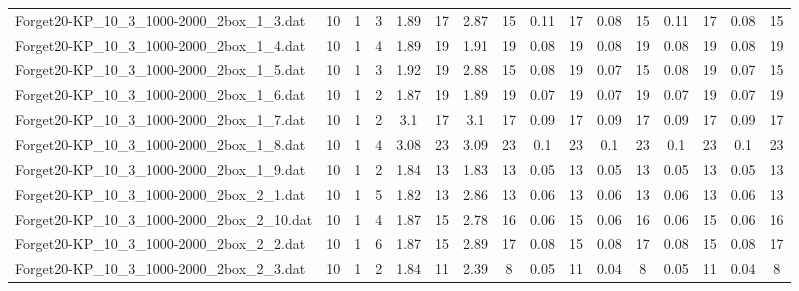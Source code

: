 \begin{sidewaystable}[!ht]
{\begin{tabular}{lccccccccccccccc}
Forget20-KP\_10\_3\_1000-2000\_2box\_1\_3.dat & 10 & 1 & 3 & 1.89 & 17 & 2.87 & 15 & 0.11 & 17 & 0.08 & 15 & 0.11 & 17 & 0.08 & 15 \\
Forget20-KP\_10\_3\_1000-2000\_2box\_1\_4.dat & 10 & 1 & 4 & 1.89 & 19 & 1.91 & 19 &  \textcolor{blue2}{0.08} & 19 &  \textcolor{blue2}{0.08} & 19 &  \textcolor{blue2}{0.08} & 19 &  \textcolor{blue2}{0.08} & 19 \\
Forget20-KP\_10\_3\_1000-2000\_2box\_1\_5.dat & 10 & 1 & 3 & 1.92 & 19 & 2.88 & 15 & 0.08 & 19 &  \textcolor{blue2}{0.07} & 15 & 0.08 & 19 &  \textcolor{blue2}{0.07} & 15 \\
Forget20-KP\_10\_3\_1000-2000\_2box\_1\_6.dat & 10 & 1 & 2 & 1.87 & 19 & 1.89 & 19 &  \textcolor{blue2}{0.07} & 19 &  \textcolor{blue2}{0.07} & 19 &  \textcolor{blue2}{0.07} & 19 &  \textcolor{blue2}{0.07} & 19 \\
Forget20-KP\_10\_3\_1000-2000\_2box\_1\_7.dat & 10 & 1 & 2 & 3.1 & 17 & 3.1 & 17 &  \textcolor{blue2}{0.09} & 17 &  \textcolor{blue2}{0.09} & 17 &  \textcolor{blue2}{0.09} & 17 &  \textcolor{blue2}{0.09} & 17 \\
Forget20-KP\_10\_3\_1000-2000\_2box\_1\_8.dat & 10 & 1 & 4 & 3.08 & 23 & 3.09 & 23 &  \textcolor{blue2}{0.1} & 23 &  \textcolor{blue2}{0.1} & 23 &  \textcolor{blue2}{0.1} & 23 &  \textcolor{blue2}{0.1} & 23 \\
Forget20-KP\_10\_3\_1000-2000\_2box\_1\_9.dat & 10 & 1 & 2 & 1.84 & 13 & 1.83 & 13 &  \textcolor{blue2}{0.05} & 13 &  \textcolor{blue2}{0.05} & 13 &  \textcolor{blue2}{0.05} & 13 &  \textcolor{blue2}{0.05} & 13 \\
Forget20-KP\_10\_3\_1000-2000\_2box\_2\_1.dat & 10 & 1 & 5 & 1.82 & 13 & 2.86 & 13 &  \textcolor{blue2}{0.06} & 13 &  \textcolor{blue2}{0.06} & 13 &  \textcolor{blue2}{0.06} & 13 &  \textcolor{blue2}{0.06} & 13 \\
Forget20-KP\_10\_3\_1000-2000\_2box\_2\_10.dat & 10 & 1 & 4 & 1.87 & 15 & 2.78 & 16 &  \textcolor{blue2}{0.06} & 15 &  \textcolor{blue2}{0.06} & 16 &  \textcolor{blue2}{0.06} & 15 &  \textcolor{blue2}{0.06} & 16 \\
Forget20-KP\_10\_3\_1000-2000\_2box\_2\_2.dat & 10 & 1 & 6 & 1.87 & 15 & 2.89 & 17 &  \textcolor{blue2}{0.08} & 15 &  \textcolor{blue2}{0.08} & 17 &  \textcolor{blue2}{0.08} & 15 &  \textcolor{blue2}{0.08} & 17 \\
Forget20-KP\_10\_3\_1000-2000\_2box\_2\_3.dat & 10 & 1 & 2 & 1.84 & 11 & 2.39 & 8 & 0.05 & 11 &  \textcolor{blue2}{0.04} & 8 & 0.05 & 11 &  \textcolor{blue2}{0.04} & 8 \\

\end{tabular}}
\end{sidewaystable}
